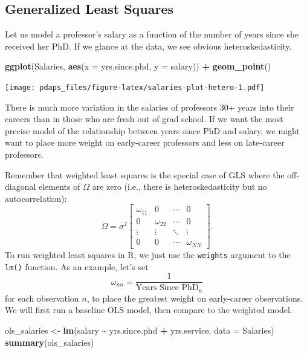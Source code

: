 \documentclass[
  12pt,
  oneside,openany]{book}
\newenvironment{Shaded}{\begin{snugshade}}{\end{snugshade}}
\newcommand{\DataTypeTok}[1]{\textcolor[rgb]{0.13,0.29,0.53}{#1}}
\newcommand{\KeywordTok}[1]{\textcolor[rgb]{0.13,0.29,0.53}{\textbf{#1}}}
\newcommand{\NormalTok}[1]{#1}
\newcommand{\OperatorTok}[1]{\textcolor[rgb]{0.81,0.36,0.00}{\textbf{#1}}}
\newcommand{\StringTok}[1]{\textcolor[rgb]{0.31,0.60,0.02}{#1}}
\begin{document}
\hypertarget{generalized-least-squares-1}{%
\subsection{Generalized Least Squares}\label{generalized-least-squares-1}}

Let us model a professor's salary as a function of the number of years since she received her PhD. If we glance at the data, we see obvious heteroskedasticity.

\begin{Shaded}
\begin{Highlighting}[]
\KeywordTok{ggplot}\NormalTok{(Salaries, }\KeywordTok{aes}\NormalTok{(}\DataTypeTok{x =}\NormalTok{ yrs.since.phd, }\DataTypeTok{y =}\NormalTok{ salary)) }\OperatorTok{+}
\StringTok{    }\KeywordTok{geom\_point}\NormalTok{()}
\end{Highlighting}
\end{Shaded}

\texttt{[image: pdaps\_files/figure-latex/salaries-plot-hetero-1.pdf]}

There is much more variation in the salaries of professors 30+ years into their careers than in those who are fresh out of grad school. If we want the most precise model of the relationship between years since PhD and salary, we might want to place more weight on early-career professors and less on late-career professors.

Remember that weighted least squares is the special case of GLS where the off-diagonal elements of \(\Omega\) are zero (i.e., there is heteroskedasticity but no autocorrelation):
\[
\Omega = \sigma^2 \begin{bmatrix}
  \omega_{11} & 0 & \cdots & 0 \\
  0 & \omega_{22} & \cdots & 0 \\
  \vdots & \vdots & \ddots & \vdots \\
  0 & 0 & \cdots & \omega_{NN}
\end{bmatrix}.
\]
To run weighted least squares in R, we just use the \texttt{weights} argument to the \texttt{lm()} function. As an example, let's set
\[
\omega_{nn} = \frac{1}{\text{Years Since PhD}_n}
\]
for each observation \(n\), to place the greatest weight on early-career observations. We will first run a baseline OLS model, then compare to the weighted model.

\begin{Shaded}
\begin{Highlighting}[]
\NormalTok{ols\_salaries <{-}}\StringTok{ }\KeywordTok{lm}\NormalTok{(salary }\OperatorTok{\textasciitilde{}}\StringTok{ }\NormalTok{yrs.since.phd }\OperatorTok{+}\StringTok{ }\NormalTok{yrs.service,}
                   \DataTypeTok{data =}\NormalTok{ Salaries)}
\KeywordTok{summary}\NormalTok{(ols\_salaries)}
\end{Highlighting}
\end{Shaded}
\end{document}
